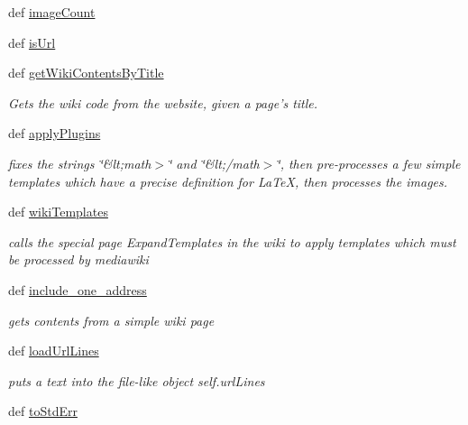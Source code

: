 \begin{DoxyCompactItemize}
def \hyperlink{classuicilibris_1_1wikiParser_1_1wikiParser_a346a627060b640a5ff92a8cda259b470}{image\-Count}
\item 
def \hyperlink{classuicilibris_1_1wikiParser_1_1wikiParser_ad379cfe2bffe3ba1e29226fe37144a0c}{is\-Url}
\item 
def \hyperlink{classuicilibris_1_1wikiParser_1_1wikiParser_a4f51eda5708d394cf790242ee181cf5b}{get\-Wiki\-Contents\-By\-Title}
\begin{DoxyCompactList}\small\item\em \-Gets the wiki code from the website, given a page's title. \end{DoxyCompactList}\item 
def \hyperlink{classuicilibris_1_1wikiParser_1_1wikiParser_a9b94d5c7305f2a3442cfab3ae0eb2a4a}{apply\-Plugins}
\begin{DoxyCompactList}\small\item\em fixes the strings \char`\"{}\&lt;math$>$\char`\"{} and \char`\"{}\&lt;/math$>$\char`\"{}, then pre-\/processes a few simple templates which have a precise definition for \-La\-Te\-X, then processes the images. \end{DoxyCompactList}\item 
def \hyperlink{classuicilibris_1_1wikiParser_1_1wikiParser_af79280e089c16ff3105d73e45db8705b}{wiki\-Templates}
\begin{DoxyCompactList}\small\item\em calls the special page \-Expand\-Templates in the wiki to apply templates which must be processed by mediawiki \end{DoxyCompactList}\item 
def \hyperlink{classuicilibris_1_1wikiParser_1_1wikiParser_ac5365eaf7f17aa4e365e04cb14e69f25}{include\-\_\-one\-\_\-address}
\begin{DoxyCompactList}\small\item\em gets contents from a simple wiki page \end{DoxyCompactList}\item 
def \hyperlink{classuicilibris_1_1wikiParser_1_1wikiParser_ad592f3c41f213a79d99ba112997e1119}{load\-Url\-Lines}
\begin{DoxyCompactList}\small\item\em puts a text into the file-\/like object self.\-url\-Lines \end{DoxyCompactList}\item 
def \hyperlink{classuicilibris_1_1wikiParser_1_1wikiParser_ad28564c6961cdd8a72d8dbe417c2b349}{to\-Std\-Err}

\end{DoxyCompactItemize}
